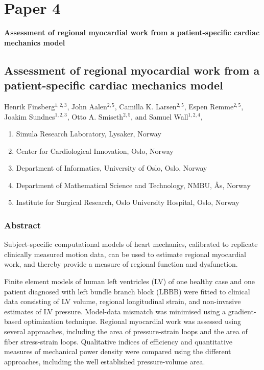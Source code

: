 


\graphicspath{{chapters/paper4/}}


\chapter{Paper 4}
{\Huge \textbf{Assessment of regional myocardial work from a patient-specific
  cardiac mechanics model}}

\newpage
\section*{Assessment of regional myocardial work from a patient-specific
  cardiac mechanics model}

  Henrik Finsberg$^{1,2,3}$,
  John Aalen$^{2,5}$,
  Camilla K. Larsen$^{2,5}$,
  Espen Remme$^{2,5}$,
  Joakim Sundnes$^{1,2,3}$,
  Otto A. Smiseth$^{2,5}$, and
  Samuel Wall$^{1,2,4}$,

\footnotesize
\begin{enumerate}[itemsep=-2mm]
\item{Simula Research Laboratory, Lysaker, Norway}
\item{Center for Cardiological Innovation, Oslo, Norway}
\item{Department of Informatics, University of Oslo, Oslo, Norway}
\item{Department of Mathematical Science and Technology, NMBU, \r{A}s,
    Norway}
\item{Institute for Surgical Research, Oslo University Hospital, Oslo,
    Norway} 
\end{enumerate}
\normalsize
 

\subsection*{Abstract}
Subject-specific computational models of heart mechanics, calibrated
to replicate clinically measured motion data, can be used to estimate
regional myocardial work, and thereby provide a measure of regional
function and dysfunction. 

Finite element models of human left ventricles (LV) of one healthy
case and one patient diagnosed with left bundle branch block (LBBB)
were fitted to clinical data consisting of LV volume, regional
longitudinal strain, and non-invasive estimates of LV
pressure. Model-data mismatch was minimised using a gradient-based
optimization technique. Regional myocardial work was assessed using
several approaches, including the area of pressure-strain loops and
the area of fiber stress-strain loops. Qualitative indices of
efficiency and quantitative measures of mechanical power density were
compared using the different approaches, including the well
established pressure-volume area. 

